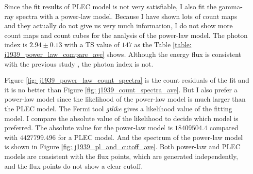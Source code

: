 \documentclass[a4paper, 12pt]{report}
\begin{document}
        Since the fit results of PLEC model is not very satisfiable, I also fit the 
        gamma-ray spectra with a power-law model. Because I have shown lots of count maps 
        and they actually do not give us very much information, I do not show more count maps 
        and count cubes for the analysis of the power-law model. The photon index is 
        $2.94\pm0.13$ with a TS value of $147$ as the Table 
        \ref{table: j1939_power_law_compare_ave} shows. Although the energy flux is consistent 
        with the previous study \citep{0004-637X-787-2-167}, the photon 
        index is not.
        \begin{table}[!htp]
          \centering
            \caption[Photon index comparison of power-law model between different 
              studies.]
              {Photon index comparison of power-law model between different 
              studies. The data of column Previous Results are from
              \citet{0004-637X-787-2-167}.}
            \label{table: j1939_power_law_compare_ave}        
        \end{table}  

        Figure \ref{fig: j1939_power_law_count_spectra} is the count residuals of the fit and 
        it is no better than Figure \ref{fig: j1939_count_spectra_ave}. But I also prefer a 
        power-law model since the likelihood of the power-law model is much larger than the 
        PLEC model. The Fermi tool \textit{gtlike} gives a likelihood value of the 
        fitting model. I compare the absolute value of the likelihood to decide which model 
        is preferred. The absolute value for the power-law model is $18409504.4$ compared with 
        $4427799.496$ for a PLEC model. And the spectrum of the power-law model is 
        shown in Figure \ref{fig: j1939_pl_and_cutoff_ave}. Both power-law and PLEC 
        models are consistent with the flux points, which are generated independently, and 
        the flux points do not show a clear cutoff. 
\end{document}
